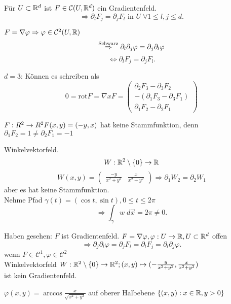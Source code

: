 \documentclass[../ana2.tex]{subfiles}
\begin{document}
\begin{satz}[Rotationsfreiheit]
    Für \( U \subset \mathbb{R}^d \) ist \( F \in \mathcal{C}(U, \mathbb{R}^d) \)
    ein Gradientenfeld.
    \[ \Rightarrow \partial_l F_j 
    = \partial_j F_l \text{ in } U 
    \;\forall 1 \leq l,j \leq d. \]
\end{satz}
\begin{bew}
    \( F = \nabla \varphi \Rightarrow \varphi \in \mathcal{C}^2(U, \mathbb{R}) \)
    \[ \overset{\text{Schwarz}}{\Rightarrow} \partial_l \partial_j \varphi = \partial_j \partial_l \varphi \]
    \[ \Leftrightarrow \partial_l F_j = \partial_j F_l. \]
\end{bew}
\( d = 3 \): Können es schreiben als 
\[ 0 = \mathrm{rot} F = \nabla x F  = \begin{pmatrix}
    \partial_2 F_3 - \partial_3 F_2 \\
    -(\partial_1 F_3 - \partial_3 F_1) \\
    \partial_1 F_2 - \partial_2 F_1 
\end{pmatrix} \]
\begin{bsp}
    \(F:R^2\rightarrow R^2  F(x,y) = (-y, x)\)
    hat keine Stammfunktion, denn \(\partial_1 F_2 = 1 \neq \partial_2 F_1 = -1\)
\end{bsp}
\begin{bsp}
    Winkelvektorfeld.
    \[ W:\mathbb{R}^2 \setminus \{0\}\rightarrow \mathbb{R} \]
    \[ W(x,y) = \begin{pmatrix}
        \frac{-y}{x^2 + y^2} & \frac{x}{x^2 + y^2}
    \end{pmatrix} \Rightarrow \partial_1 W_2 = \partial_2 W_1 \]
    aber es hat keine Stammfunktion.\\
    Nehme Pfad \( \gamma(t) = (\cos t, \sin t), 0 \leq t \leq 2\pi \)
    \[ \Rightarrow \int_\gamma w \; d\vec{x} = 2\pi \neq 0. \]
\end{bsp}
Haben gesehen: \(F\) ist Gradientenfeld. 
\( F = \nabla \varphi, \varphi:U\rightarrow \mathbb{R}, U \subset \mathbb{R}^d \) 
offen 
\[ \Rightarrow \partial_j \partial_l \varphi = \partial_j F_l = 
\partial_l F_j = \partial_l \partial_j \varphi. \] 
wenn \( F \in \mathcal{C}^1, \varphi \in \mathcal{C}^2 \)\\
Winkelvektorfeld \(W:\mathbb{R}^2 \setminus \{0\}\rightarrow \mathbb{R}^2; 
(x,y) \mapsto (-\frac{y}{x^2+y^2}, \frac{x}{x^2+y^2})\)\\
ist kein Gradientenfeld.
\begin{bsp}
    \(\varphi(x,y) = \arccos \frac{x}{\sqrt{x^2+y^2}}\)
    auf oberer Halbebene \(\{(x,y): x \in \mathbb{R}, y > 0\}\)
\end{bsp}
\end{document}
